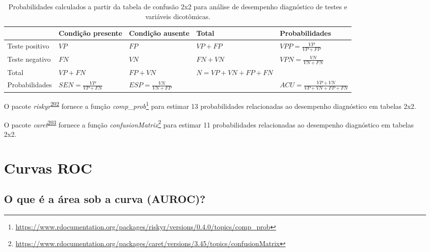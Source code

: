 \documentclass[
  a4paper,
]{book}
\renewcommand{\href}[2]{#2\footnote{\url{#1}}}
\newenvironment{infobox}[1]
  {
  \begin{itemize}
  \renewcommand{\labelitemi}{
    \raisebox{-.7\height}[0pt][0pt]{
      {\setkeys{Gin}{width=3em,keepaspectratio}
        \texttt{[image: \#1]}}
    }
  }
  \setlength{\fboxsep}{1em}
  \begin{blackbox}
  \item
  }
  {
  \end{blackbox}
  \end{itemize}
  }
\begin{document}
\begin{table}

\caption{\label{tab:crosstable-prob}Probabilidades calculados a partir da tabela de confusão 2x2 para análise de desempenho diagnóstico de testes e variáveis dicotômicas.}
\centering
\begin{tabu} to 
\toprule
\textbf{ } & \textbf{Condição presente} & \textbf{Condição ausente} & \textbf{Total} & \textbf{Probabilidades}\\
\midrule
Teste positivo & $VP$ & $FP$ & $VP+FP$ & $VPP = \frac{VP}{VP+FP}$\\
Teste negativo & $FN$ & $VN$ & $FN+VN$ & $VPN = \frac{VN}{VN+FN}$\\
Total & $VP+FN$ & $FP+VN$ & $N=VP+VN+FP+FN$ & \\
Probabilidades & $SEN = \frac{VP}{VP+FN}$ & $ESP = \frac{VN}{VN+FP}$ &  & $ACU = \frac{VP+VN}{VP+VN+FP+FN}$\\
\bottomrule
\end{tabu}
\end{table}

\begin{infobox}{images/Rlogo}
O pacote \emph{riskyr}\textsuperscript{\protect\hyperlink{ref-riskyr}{202}} fornece a função \href{https://www.rdocumentation.org/packages/riskyr/versions/0.4.0/topics/comp_prob}{\emph{comp\_prob}} para estimar 13 probabilidades relacionadas ao desempenho diagnóstico em tabelas 2x2.

\end{infobox}

\begin{infobox}{images/Rlogo}
O pacote \emph{caret}\textsuperscript{\protect\hyperlink{ref-caret}{203}} fornece a função \href{https://www.rdocumentation.org/packages/caret/versions/3.45/topics/confusionMatrix}{\emph{confusionMatrix}} para estimar 11 probabilidades relacionadas ao desempenho diagnóstico em tabelas 2x2.

\end{infobox}

\hypertarget{curvas-roc}{%
\section{Curvas ROC}\label{curvas-roc}}

\hypertarget{o-que-uxe9-a-uxe1rea-sob-a-curva-auroc}{%
\subsection{O que é a área sob a curva (AUROC)?}\label{o-que-uxe9-a-uxe1rea-sob-a-curva-auroc}}
\end{document}
